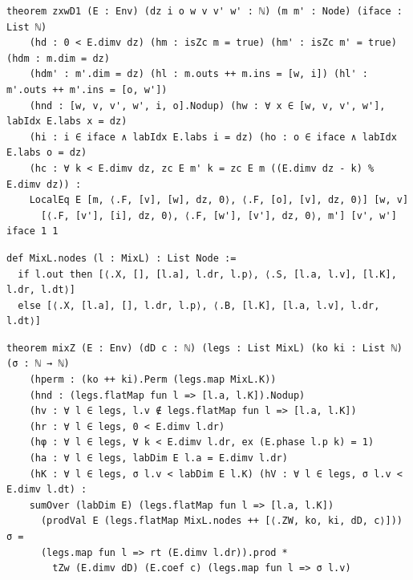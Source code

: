 \begin{lstlisting}[style=leancore]
theorem zxwD1 (E : Env) (dz i o w v v' w' : ℕ) (m m' : Node) (iface : List ℕ)
    (hd : 0 < E.dimv dz) (hm : isZc m = true) (hm' : isZc m' = true) (hdm : m.dim = dz)
    (hdm' : m'.dim = dz) (hl : m.outs ++ m.ins = [w, i]) (hl' : m'.outs ++ m'.ins = [o, w'])
    (hnd : [w, v, v', w', i, o].Nodup) (hw : ∀ x ∈ [w, v, v', w'], labIdx E.labs x = dz)
    (hi : i ∈ iface ∧ labIdx E.labs i = dz) (ho : o ∈ iface ∧ labIdx E.labs o = dz)
    (hc : ∀ k < E.dimv dz, zc E m' k = zc E m ((E.dimv dz - k) % E.dimv dz)) :
    LocalEq E [m, ⟨.F, [v], [w], dz, 0⟩, ⟨.F, [o], [v], dz, 0⟩] [w, v]
      [⟨.F, [v'], [i], dz, 0⟩, ⟨.F, [w'], [v'], dz, 0⟩, m'] [v', w'] iface 1 1
\end{lstlisting}
\begin{lstlisting}[style=leancore]
def MixL.nodes (l : MixL) : List Node :=
  if l.out then [⟨.X, [], [l.a], l.dr, l.p⟩, ⟨.S, [l.a, l.v], [l.K], l.dr, l.dt⟩]
  else [⟨.X, [l.a], [], l.dr, l.p⟩, ⟨.B, [l.K], [l.a, l.v], l.dr, l.dt⟩]
\end{lstlisting}
\begin{lstlisting}[style=leancore]
theorem mixZ (E : Env) (dD c : ℕ) (legs : List MixL) (ko ki : List ℕ) (σ : ℕ → ℕ)
    (hperm : (ko ++ ki).Perm (legs.map MixL.K))
    (hnd : (legs.flatMap fun l => [l.a, l.K]).Nodup)
    (hv : ∀ l ∈ legs, l.v ∉ legs.flatMap fun l => [l.a, l.K])
    (hr : ∀ l ∈ legs, 0 < E.dimv l.dr)
    (hφ : ∀ l ∈ legs, ∀ k < E.dimv l.dr, ex (E.phase l.p k) = 1)
    (ha : ∀ l ∈ legs, labDim E l.a = E.dimv l.dr)
    (hK : ∀ l ∈ legs, σ l.v < labDim E l.K) (hV : ∀ l ∈ legs, σ l.v < E.dimv l.dt) :
    sumOver (labDim E) (legs.flatMap fun l => [l.a, l.K])
      (prodVal E (legs.flatMap MixL.nodes ++ [⟨.ZW, ko, ki, dD, c⟩])) σ =
      (legs.map fun l => rt (E.dimv l.dr)).prod *
        tZw (E.dimv dD) (E.coef c) (legs.map fun l => σ l.v)
\end{lstlisting}

